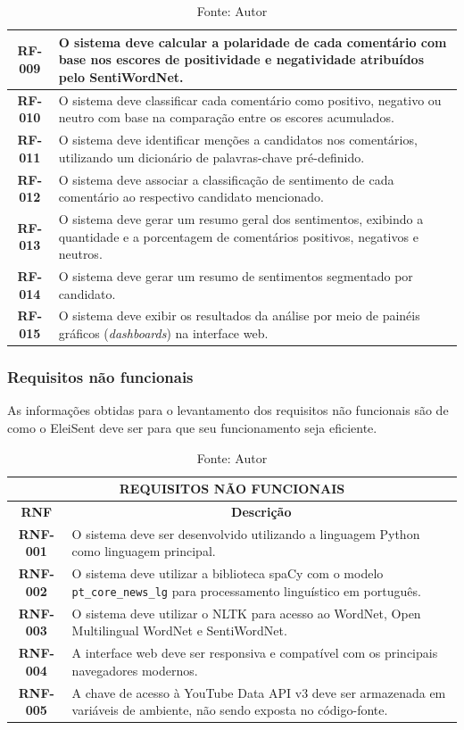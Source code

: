 \documentclass[
	12pt,				%
	openright,			%
	oneside,			%
	a4paper,			%
	english,			%
	brazil				%
	]{abntex2}
\begin{document}
\begin{table}[!htbp]
\begin{tabular}{|c|p{11cm}|}
\textbf{RF-009} & O sistema deve calcular a polaridade de cada comentário com base nos escores de positividade e negatividade atribuídos pelo SentiWordNet. \\ \hline
\textbf{RF-010} & O sistema deve classificar cada comentário como positivo, negativo ou neutro com base na comparação entre os escores acumulados. \\ \hline
\textbf{RF-011} & O sistema deve identificar menções a candidatos nos comentários, utilizando um dicionário de palavras-chave pré-definido. \\ \hline
\textbf{RF-012} & O sistema deve associar a classificação de sentimento de cada comentário ao respectivo candidato mencionado. \\ \hline
\textbf{RF-013} & O sistema deve gerar um resumo geral dos sentimentos, exibindo a quantidade e a porcentagem de comentários positivos, negativos e neutros. \\ \hline
\textbf{RF-014} & O sistema deve gerar um resumo de sentimentos segmentado por candidato. \\ \hline
\textbf{RF-015} & O sistema deve exibir os resultados da análise por meio de painéis gráficos (\textit{dashboards}) na interface web. \\ \hline
\end{tabular}
\caption*{\footnotesize Fonte: Autor}
\end{table}
\subsubsection{Requisitos não funcionais}
As informações obtidas para o levantamento dos requisitos não funcionais são de como o EleiSent deve ser para que seu funcionamento seja eficiente.
\begin{table}[H]
\centering
\caption{Tabela de requisitos não funcionais}
\label{tab:req_nao_funcionais}
\footnotesize
\begin{tabular}{|c|p{10cm}|}
\hline
\multicolumn{2}{|c|}{\textbf{REQUISITOS NÃO FUNCIONAIS}} \\ \hline
\textbf{RNF} & \multicolumn{1}{c|}{\textbf{Descrição}} \\ \hline
\textbf{RNF-001} & O sistema deve ser desenvolvido utilizando a linguagem Python como linguagem principal. \\ \hline
\textbf{RNF-002} & O sistema deve utilizar a biblioteca spaCy com o modelo \texttt{pt\_core\_news\_lg} para processamento linguístico em português. \\ \hline
\textbf{RNF-003} & O sistema deve utilizar o NLTK para acesso ao WordNet, Open Multilingual WordNet e SentiWordNet. \\ \hline
\textbf{RNF-004} & A interface web deve ser responsiva e compatível com os principais navegadores modernos. \\ \hline
\textbf{RNF-005} & A chave de acesso à YouTube Data API v3 deve ser armazenada em variáveis de ambiente, não sendo exposta no código-fonte. \\ \hline
\end{tabular}
\caption*{\footnotesize Fonte: Autor}
\end{table}
\end{document}
